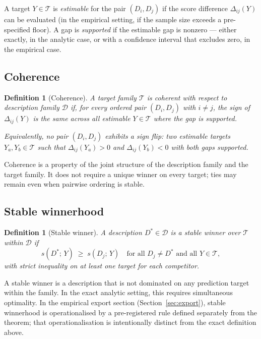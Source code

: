 \documentclass[11pt]{article}
\newtheorem{definition}[theorem]{Definition}
\begin{document}
A target $Y \in \mathcal{T}$ is \emph{estimable} for the pair $(D_i, D_j)$
if the score difference $\Delta_{ij}(Y)$ can be evaluated
(in the empirical setting, if the sample size exceeds a pre-specified floor).
A gap is \emph{supported} if the estimable gap is nonzero ---
either exactly, in the analytic case, or with a confidence interval
that excludes zero, in the empirical case.

\subsection{Coherence}

\begin{definition}[Coherence]
A target family $\mathcal{T}$ is \emph{coherent} with respect to
description family $\mathcal{D}$ if,
for every ordered pair $(D_i, D_j)$ with $i \neq j$,
the sign of $\Delta_{ij}(Y)$ is the same across all estimable
$Y \in \mathcal{T}$ where the gap is supported.

Equivalently, no pair $(D_i, D_j)$ exhibits a \emph{sign flip}:
two estimable targets $Y_a, Y_b \in \mathcal{T}$ such that
$\Delta_{ij}(Y_a) > 0$ and $\Delta_{ij}(Y_b) < 0$
with both gaps supported.
\end{definition}

Coherence is a property of the joint structure of the description family and
the target family.
It does not require a unique winner on every target;
ties may remain even when pairwise ordering is stable.

\subsection{Stable winnerhood}

\begin{definition}[Stable winner]
A description $D^* \in \mathcal{D}$ is a \emph{stable winner} over
$\mathcal{T}$ within $\mathcal{D}$ if
\begin{equation}
    s(D^*;\, Y) \;\geq\; s(D_j;\, Y)
    \quad \text{for all } D_j \neq D^* \text{ and all } Y \in \mathcal{T},
\end{equation}
with strict inequality on at least one target for each competitor.
\end{definition}

A stable winner is a description that is not dominated on any prediction target
within the family.
In the exact analytic setting, this requires simultaneous optimality.
In the empirical export section (Section~\ref{sec:export}),
stable winnerhood is operationalised by a pre-registered rule
defined separately from the theorem; that operationalisation is
intentionally distinct from the exact definition above.
\end{document}
